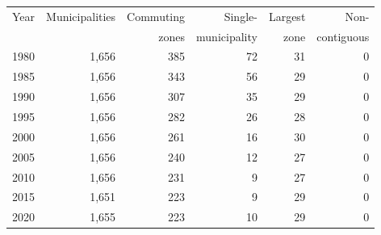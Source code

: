 \begin{tabular}{lrrrrr}
\toprule
Year & Municipalities & Commuting & Single- & Largest & Non- \\& & zones & municipality & zone & contiguous \\
\midrule
1980 & 1,656 & 385 & 72 & 31 & 0 \\
1985 & 1,656 & 343 & 56 & 29 & 0 \\
1990 & 1,656 & 307 & 35 & 29 & 0 \\
1995 & 1,656 & 282 & 26 & 28 & 0 \\
2000 & 1,656 & 261 & 16 & 30 & 0 \\
2005 & 1,656 & 240 & 12 & 27 & 0 \\
2010 & 1,656 & 231 & 9 & 27 & 0 \\
2015 & 1,651 & 223 & 9 & 29 & 0 \\
2020 & 1,655 & 223 & 10 & 29 & 0 \\
\bottomrule
\end{tabular}
